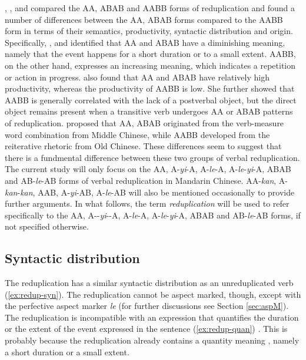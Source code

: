  \citet{Fan1964}, \citet{Arcodiaetal2014}, \citet{MelloniBasciano2018} and \citet{Xie2020} compared the AA, ABAB and AABB forms of reduplication 
and found a number of differences between the AA, ABAB forms compared to the AABB form in terms of their semantics, productivity, syntactic distribution and origin. 
Specifically, \citet{Arcodiaetal2014}, \citet{MelloniBasciano2018} and \citet{Xie2020} identified that AA and ABAB have a diminishing meaning, 
namely that the event happens for a short duration or to a small extent. 
AABB, on the other hand, expresses an increasing meaning, which indicates a repetition or action in progress. 
\citet{Xie2020} also found that AA and ABAB have relatively high productivity, 
whereas the productivity of AABB is low. 
She further showed that AABB is generally correlated with the lack of a postverbal object, but the direct object remains present when a transitive verb undergoes AA or ABAB patterns of reduplication. 
\citet[277]{Fan1964} proposed that AA, ABAB originated from the verb-measure word combination from Middle Chinese, 
while AABB developed from the reiterative rhetoric from Old Chinese. 
These differences seem to suggest that there is a fundmental difference between these two groups of verbal reduplication. 
The current study will only focus on the AA, A-\textit{yi}-A, A-\textit{le}-A, A-\textit{le}-\textit{yi}-A, ABAB and AB-\textit{le}-AB forms of verbal reduplication in Mandarin Chinese.
AA-\textit{kan}, A-\textit{kan}-\textit{kan}, AAB, A-\textit{yi}-AB, A-\textit{le}-AB will also be mentioned occasionally to provide further arguments.
In what follows, the term \textit{reduplication} will be used  to refer specifically to the AA, A\hyp{}-\textit{yi}\hyp{}-A, A-\textit{le}-A, A-\textit{le}-\textit{yi}-A, ABAB and AB-\textit{le}-AB forms, if not specified otherwise.




\subsection{Syntactic distribution}\label{sec:syn-dis}

The reduplication has a similar syntactic distribution as an unreduplicated verb (\ref{ex:redup-syn}). 
The reduplication cannot be aspect marked, though, except with the perfective aspect marker \textit{le} (for further discussions see Section \ref{sec:aspM}). 
The reduplication is incompatible with an expression that quantifies the duration or the extent of the event expressed in the sentence (\ref{ex:redup-quan}) \citetext{\citealp[114--115]{Chen2005}; \citealp[83--84]{Li1998}}.
This is probably because the reduplication already contains a quantity meaning \citetext{\citealp[114--115]{Chen2005}; \citealp[84]{Li1998}}, namely a short duration or a small extent.

